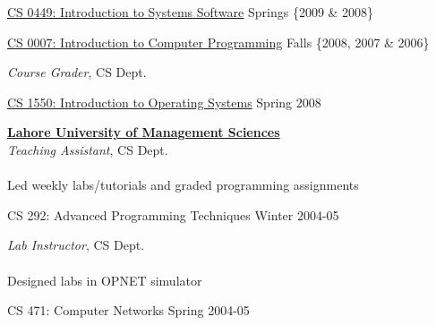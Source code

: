 \documentclass[10pt]{article}
\newenvironment{innerlist}[1][\enskip\textbullet]%
        {\begin{compactitem}[#1]}{\end{compactitem}}
\begin{document}
\begin{innerlist}
\item \href{http://www.cs.pitt.edu/undergrad/courses/cs0449.php}
           {CS 0449: Introduction to Systems Software}%
			\hfill {Springs \{2009 \& 2008\}}
\item \href{http://www.cs.pitt.edu/undergrad/courses/cs0007.php}
           {CS 0007: Introduction to Computer Programming}%
			\hfill {Falls \{2008, 2007 \& 2006\}} \\
\end{innerlist}

\textit{Course Grader}, CS Dept.
\begin{innerlist}
\item \href{http://www.cs.pitt.edu/undergrad/courses/cs1550.php}
           {CS 1550: Introduction to Operating Systems}%
			\hfill {Spring 2008} \\
\end{innerlist}
\href{http://www.lums.edu.pk}{\textbf{Lahore University of Management Sciences}} \\
\textit{Teaching Assistant}, CS Dept. \\
\\
Led weekly labs/tutorials and graded programming assignments 

\begin{innerlist}
\item {CS 292: Advanced Programming Techniques}%
			\hfill {Winter 2004-05}
\end{innerlist}

\textit{Lab Instructor}, CS Dept. \\
\\
Designed labs in OPNET simulator 

\begin{innerlist}
\item {CS 471: Computer Networks}%
			\hfill {Spring 2004-05}
\end{innerlist}
\end{document}
